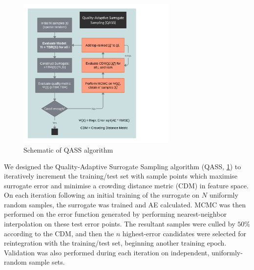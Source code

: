 \begin{figure}
  \vspace{-35pt}
  \begin{center}
    \includegraphics[width=0.7\textwidth]{fig4_qassplan.png}
    \caption{Schematic of QASS algorithm}
    \label{fig:qassplan}
  \end{center}
  \vspace{-80pt}
\end{figure}


We designed the Quality-Adaptive Surrogate Sampling algorithm (QASS,
\cref{fig:qassplan}) to iteratively increment the training/test set with sample
points which maximise surrogate error and minimise a crowding distance metric
(CDM) \cite{Solonen2012} in feature space. On each iteration following an initial training of the surrogate on $N$ uniformly random samples, the surrogate was trained and AE calculated. MCMC was then performed on the error function generated by performing nearest-neighbor interpolation on these test error points. The resultant samples were culled by $50\%$ according to the CDM, and then the $n$ highest-error candidates were selected for reintegration with the training/test set, beginning another training epoch. Validation was also performed during each iteration on independent, uniformly-random sample sets.




